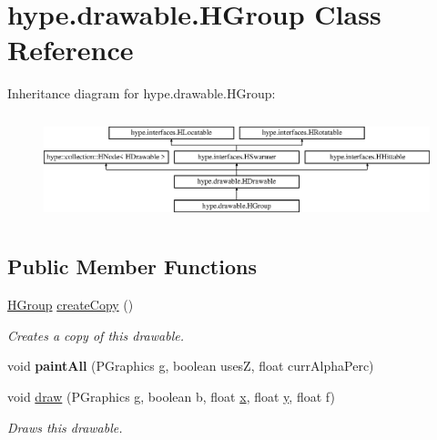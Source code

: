 \hypertarget{classhype_1_1drawable_1_1_h_group}{\section{hype.\-drawable.\-H\-Group Class Reference}
\label{classhype_1_1drawable_1_1_h_group}
}
Inheritance diagram for hype.\-drawable.\-H\-Group\-:\begin{figure}[H]
\begin{center}
\leavevmode
\includegraphics[height=3.111111cm]{classhype_1_1drawable_1_1_h_group}
\end{center}
\end{figure}
\subsection*{Public Member Functions}
\begin{DoxyCompactItemize}
\item 
\hyperlink{classhype_1_1drawable_1_1_h_group}{H\-Group} \hyperlink{classhype_1_1drawable_1_1_h_group_a95a20a6436c9d906c966d21f3faf8959}{create\-Copy} ()
\begin{DoxyCompactList}\small\item\em Creates a copy of this drawable. \end{DoxyCompactList}\item 
\hypertarget{classhype_1_1drawable_1_1_h_group_a496c3e9fdd6f0970c6dfa3ddcde363d4}{void {\bfseries paint\-All} (P\-Graphics g, boolean uses\-Z, float curr\-Alpha\-Perc)}\label{classhype_1_1drawable_1_1_h_group_a496c3e9fdd6f0970c6dfa3ddcde363d4}

\item 
void \hyperlink{classhype_1_1drawable_1_1_h_group_a561903c282e77c3e43ab0f7d9e3e4ff2}{draw} (P\-Graphics g, boolean b, float \hyperlink{classhype_1_1drawable_1_1_h_drawable_aae828fe1677025d019df207f62771def}{x}, float \hyperlink{classhype_1_1drawable_1_1_h_drawable_a47920e2ad0509a57687a687044a2f2b6}{y}, float f)
\begin{DoxyCompactList}\small\item\em Draws this drawable. \end{DoxyCompactList}\end{DoxyCompactItemize}
